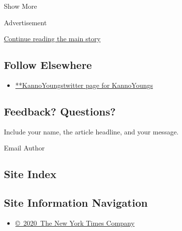Show More

Advertisement

\protect\hyperlink{after-mid2}{Continue reading the main story}

\hypertarget{follow-elsewhere}{%
\subsection{Follow Elsewhere}\label{follow-elsewhere}}

\begin{itemize}
\tightlist
\item
  \href{https://twitter.com/KannoYoungs}{**KannoYoungstwitter page for
  KannoYoungs}
\end{itemize}

\hypertarget{feedback-questions}{%
\subsection{Feedback? Questions?}\label{feedback-questions}}

Include your name, the article headline, and your message.

Email Author

\hypertarget{site-index}{%
\subsection{Site Index}\label{site-index}}

\hypertarget{site-information-navigation}{%
\subsection{Site Information
Navigation}\label{site-information-navigation}}

\begin{itemize}
\tightlist
\item
  \href{https://help.nytimes3xbfgragh.onion/hc/en-us/articles/115014792127-Copyright-notice}{©~2020~The
  New York Times Company}
\end{itemize}

